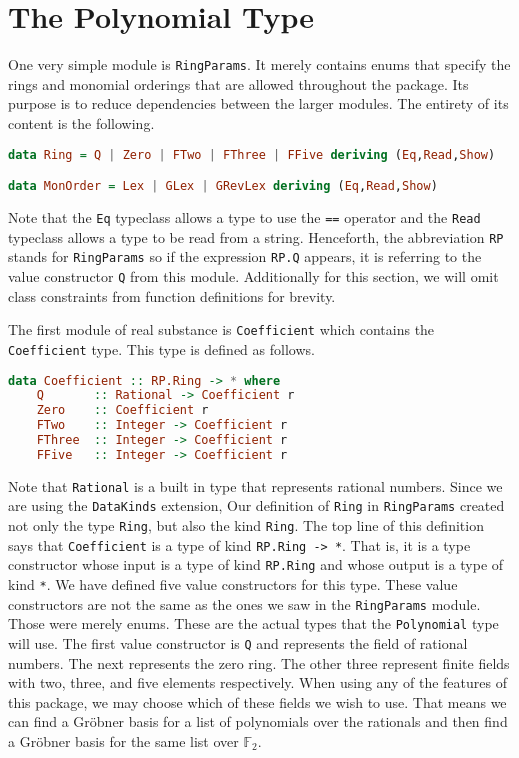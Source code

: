 \documentclass[MS, xcolor=dvipsnames]{wfuthesis}
\def\bF{\mathbb{F}}
\theoremstyle{definition}
\begin{document}
\section{The Polynomial Type}
One very simple module is \lstinline{RingParams}. It merely contains enums that specify the rings and monomial orderings that are allowed throughout the package. Its purpose is to reduce dependencies between the larger modules. The entirety of its content is the following.
\begin{lstlisting}[language=Haskell]
data Ring = Q | Zero | FTwo | FThree | FFive deriving (Eq,Read,Show)

data MonOrder = Lex | GLex | GRevLex deriving (Eq,Read,Show)
\end{lstlisting}
Note that the \lstinline{Eq} typeclass allows a type to use the \lstinline{==} operator and the \lstinline{Read} typeclass allows a type to be read from a string. Henceforth, the abbreviation \lstinline{RP} stands for \lstinline{RingParams} so if the expression \lstinline{RP.Q} appears, it is referring to the value constructor \lstinline{Q} from this module. Additionally for this section, we will omit class constraints from function definitions for brevity. \par 
The first module of real substance is \lstinline{Coefficient} which contains the \lstinline{Coefficient} type. This type is defined as follows.
\begin{lstlisting}[language=Haskell]
data Coefficient :: RP.Ring -> * where
    Q       :: Rational -> Coefficient r
    Zero    :: Coefficient r
    FTwo    :: Integer -> Coefficient r
    FThree  :: Integer -> Coefficient r
    FFive   :: Integer -> Coefficient r
\end{lstlisting}
Note that \lstinline{Rational} is a built in type that represents rational numbers. Since we are using the \lstinline{DataKinds} extension, Our definition of \lstinline{Ring} in \lstinline{RingParams} created not only the type \lstinline{Ring}, but also the kind \lstinline{Ring}. The top line of this definition says that \lstinline{Coefficient} is a type of kind \lstinline{RP.Ring -> *}. That is, it is a type constructor whose input is a type of kind \lstinline{RP.Ring} and whose output is a type of kind \lstinline{*}. We have defined five value constructors for this type. These value constructors are not the same as the ones we saw in the \lstinline{RingParams} module. Those were merely enums. These are the actual types that the \lstinline{Polynomial} type will use. The first value constructor is \lstinline{Q} and represents the field of rational numbers. The next represents the zero ring. The other three represent finite fields with two, three, and five elements respectively. When using any of the features of this package, we may choose which of these fields we wish to use. That means we can find a Gr\"obner basis for a list of polynomials over the rationals and then find a Gr\"obner basis for the same list over $\bF_2$. \par 
\end{document}

